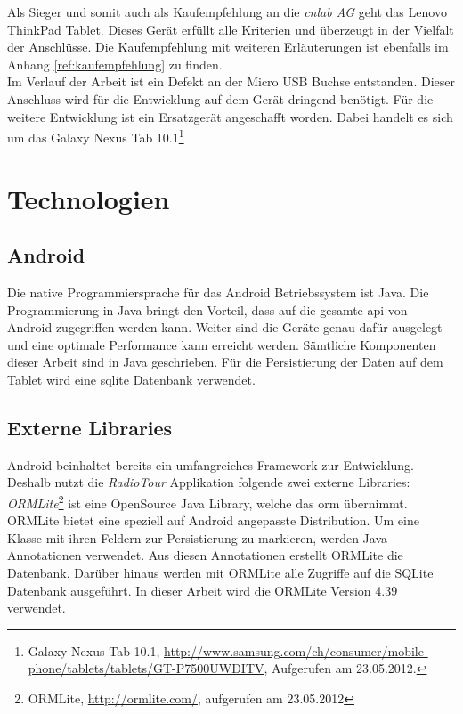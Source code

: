 Als Sieger und somit auch als Kaufempfehlung an die \textit{cnlab AG} geht das Lenovo ThinkPad Tablet. Dieses Gerät erfüllt alle Kriterien und überzeugt in der Vielfalt der Anschlüsse. Die Kaufempfehlung mit weiteren Erläuterungen ist ebenfalls im Anhang \ref{ref:kaufempfehlung} zu finden.
\\

Im Verlauf der Arbeit ist ein Defekt an der Micro USB Buchse entstanden. Dieser Anschluss wird für die Entwicklung auf dem Gerät dringend benötigt. Für die weitere Entwicklung ist ein Ersatzgerät angeschafft worden. Dabei handelt es sich um das Galaxy Nexus Tab 10.1\footnote{Galaxy Nexus Tab 10.1, \url{http://www.samsung.com/ch/consumer/mobile-phone/tablets/tablets/GT-P7500UWDITV}, Aufgerufen am 23.05.2012.}

\section{Technologien}
\subsection{Android}
Die native Programmiersprache für das Android Betriebssystem ist Java. Die Programmierung in Java bringt den Vorteil, dass auf die gesamte \gls{api} von Android zugegriffen werden kann. Weiter sind die Geräte genau dafür ausgelegt und eine optimale Performance kann erreicht werden. Sämtliche Komponenten dieser Arbeit sind in Java geschrieben. Für die Persistierung der Daten auf dem Tablet wird eine \gls{sqlite} Datenbank verwendet.

\subsection{Externe Libraries}
Android beinhaltet bereits ein umfangreiches Framework zur Entwicklung. Deshalb nutzt die \textit{RadioTour} Applikation folgende zwei externe Libraries:
\\

\textit{ORMLite}\footnote{ORMLite, \url{http://ormlite.com/}, aufgerufen am 23.05.2012} ist eine OpenSource Java Library, welche das \gls{orm} übernimmt. ORMLite bietet eine speziell auf Android angepasste Distribution. Um eine Klasse mit ihren Feldern zur Persistierung zu markieren, werden Java Annotationen verwendet. Aus diesen Annotationen erstellt ORMLite die Datenbank. Darüber hinaus werden mit ORMLite alle Zugriffe auf die SQLite Datenbank ausgeführt. In dieser Arbeit wird die ORMLite Version 4.39 verwendet.
\\

